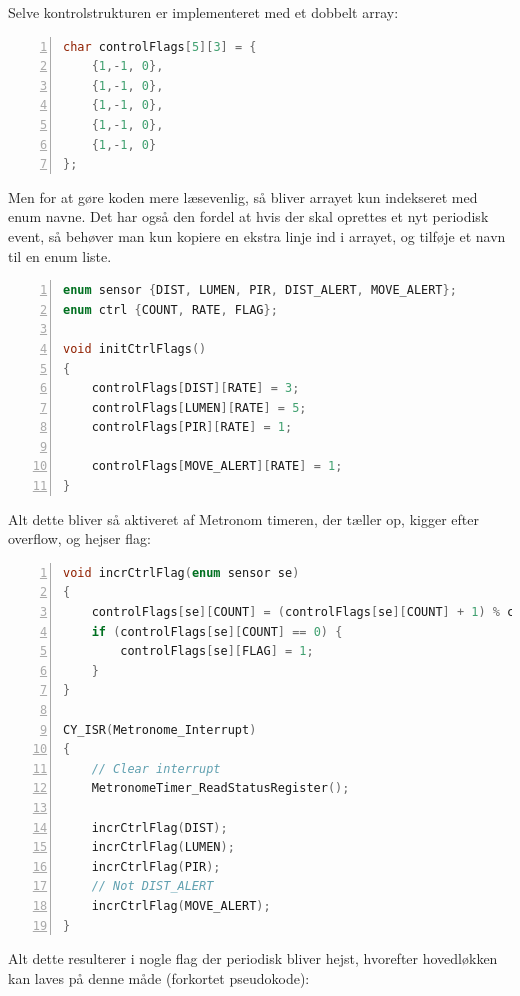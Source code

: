 Selve kontrolstrukturen er implementeret med et dobbelt array:

\begin{lstlisting}[frame=single, basicstyle=\footnotesize\ttfamily, language=C, numbers=left, numberstyle=\tiny\color{black}, caption={Kodeudsnit: controlFlags},captionpos=b]
char controlFlags[5][3] = {
    {1,-1, 0},
    {1,-1, 0},
    {1,-1, 0},
    {1,-1, 0},
    {1,-1, 0}
};
\end{lstlisting}

Men for at gøre koden mere læsevenlig, så bliver arrayet kun indekseret med enum navne. Det har også den fordel at hvis der skal oprettes et nyt periodisk event, så behøver man kun kopiere en ekstra linje ind i arrayet, og tilføje et navn til en enum liste.

\begin{lstlisting}[frame=single, basicstyle=\footnotesize\ttfamily, language=C, numbers=left, numberstyle=\tiny\color{black}, caption={Kodeudsnit: enums og indeksering},captionpos=b]
enum sensor {DIST, LUMEN, PIR, DIST_ALERT, MOVE_ALERT};
enum ctrl {COUNT, RATE, FLAG};

void initCtrlFlags()
{
    controlFlags[DIST][RATE] = 3;
    controlFlags[LUMEN][RATE] = 5;
    controlFlags[PIR][RATE] = 1;

    controlFlags[MOVE_ALERT][RATE] = 1;
}
\end{lstlisting}

Alt dette bliver så aktiveret af Metronom timeren, der tæller op, kigger efter overflow, og hejser flag:

\begin{lstlisting}[frame=single, basicstyle=\footnotesize\ttfamily, language=C, numbers=left, numberstyle=\tiny\color{black}, caption={Kodeudsnit: Metronom interrupt og hjælpefunktion},captionpos=b]
void incrCtrlFlag(enum sensor se)
{
    controlFlags[se][COUNT] = (controlFlags[se][COUNT] + 1) % controlFlags[se][RATE];
    if (controlFlags[se][COUNT] == 0) {
        controlFlags[se][FLAG] = 1;
    }
}

CY_ISR(Metronome_Interrupt)
{
    // Clear interrupt
    MetronomeTimer_ReadStatusRegister();

    incrCtrlFlag(DIST);
    incrCtrlFlag(LUMEN);
    incrCtrlFlag(PIR);
    // Not DIST_ALERT
    incrCtrlFlag(MOVE_ALERT);
}
\end{lstlisting}

Alt dette resulterer i nogle flag der periodisk bliver hejst, hvorefter hovedløkken kan laves på denne måde (forkortet pseudokode):

